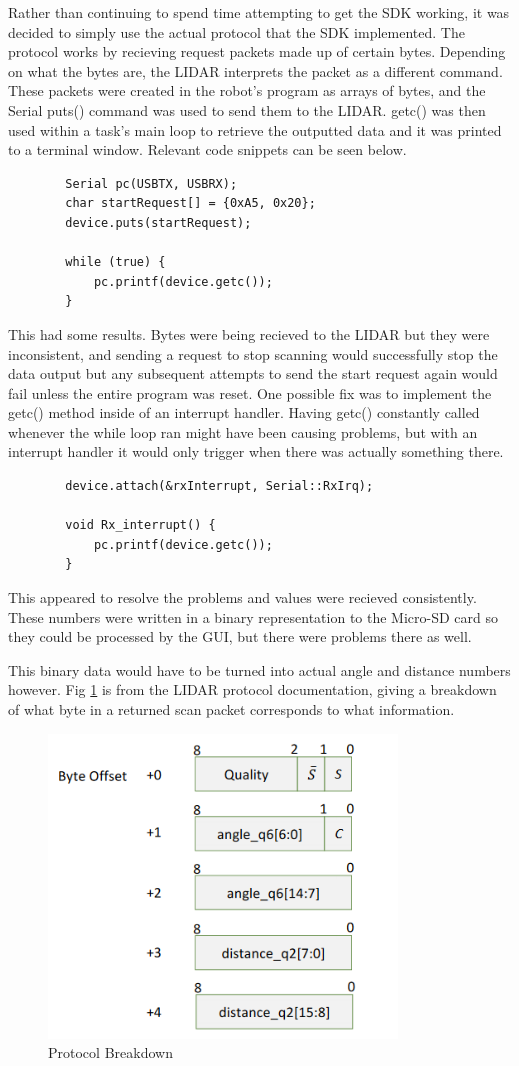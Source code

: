 		Rather than continuing to spend time attempting to get the SDK working, it was decided to simply use the actual protocol that the SDK implemented. The protocol works by recieving request packets made up of certain bytes. Depending on what the bytes are, the LIDAR interprets the packet as a different command. These packets were created in the robot's program as arrays of bytes, and the Serial puts() command was used to send them to the LIDAR. getc() was then used within a task's main loop to retrieve the outputted data and it was printed to a terminal window. Relevant code snippets can be seen below.
		\begin{lstlisting}
		Serial pc(USBTX, USBRX);
		char startRequest[] = {0xA5, 0x20};
		device.puts(startRequest);
		
		while (true) {
			pc.printf(device.getc()); 
		}
		\end{lstlisting}
		This had some results. Bytes were being recieved to the LIDAR but they were inconsistent, and sending a request to stop scanning would successfully stop the data output but any subsequent attempts to send the start request again would fail unless the entire program was reset. One possible fix was to implement the getc() method inside of an interrupt handler. Having getc() constantly called whenever the while loop ran might have been causing problems, but with an interrupt handler it would only trigger when there was actually something there.
		
		\begin{lstlisting}
		device.attach(&rxInterrupt, Serial::RxIrq);
		
		void Rx_interrupt() {
			pc.printf(device.getc());
		}
		\end{lstlisting}
		This appeared to resolve the problems and values were recieved consistently. These numbers were written in a binary representation to the Micro-SD card so they could be processed by the GUI, but there were problems there as well.
		
		This binary data would have to be turned into actual angle and distance numbers however. Fig \ref{fig:protocolbreakdown} is from the LIDAR protocol documentation, giving a breakdown of what byte in a returned scan packet corresponds to what information.
		
		\begin{figure}[ht]
			\centering
			\includegraphics[width=.6\linewidth]{SYNTHESIS/protocolbreakdown.png}
			\caption{Protocol Breakdown}
			\label{fig:protocolbreakdown}
		\end{figure}
	
